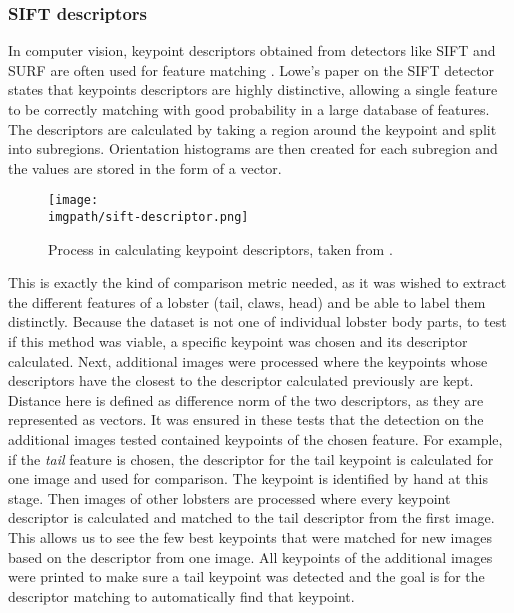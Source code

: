 \subsubsection{SIFT descriptors}
In computer vision, keypoint descriptors obtained from detectors like SIFT and SURF are often used for feature matching \cite{cv-matching}. Lowe's paper \cite{sift} on the SIFT detector states that keypoints descriptors are highly distinctive, allowing a single feature to be correctly matching with good probability in a large database of features. The descriptors are calculated by taking a region around the keypoint and split into subregions. Orientation histograms are then created for each subregion and the values are stored in the form of a vector.
\begin{figure}[H]
\texttt{[image: \\imgpath/sift-descriptor.png]}
\caption{Process in calculating keypoint descriptors, taken from \cite{fish-classification}.}
\end{figure}
\noindent
This is exactly the kind of comparison metric needed, as it was wished to extract the different features of a lobster (tail, claws, head) and be able to label them distinctly. Because the dataset is not one of individual lobster body parts, to test if this method was viable, a specific keypoint was chosen and its descriptor calculated. Next, additional images were processed where the keypoints whose descriptors have the closest to the descriptor calculated previously are kept. Distance here is defined as difference norm of the two descriptors, as they are represented as vectors. It was ensured in these tests that the detection on the additional images tested contained keypoints of the chosen feature. For example, if the \textit{tail} feature is chosen, the descriptor for the tail keypoint is calculated for one image and used for comparison. The keypoint is identified by hand at this stage. Then images of other lobsters are processed where every keypoint descriptor is calculated and matched to the tail descriptor from the first image. This allows us to see the few best keypoints that were matched for new images based on the descriptor from one image. All keypoints of the additional images were printed to make sure a tail keypoint was detected and the goal is for the descriptor matching to automatically find that keypoint.


